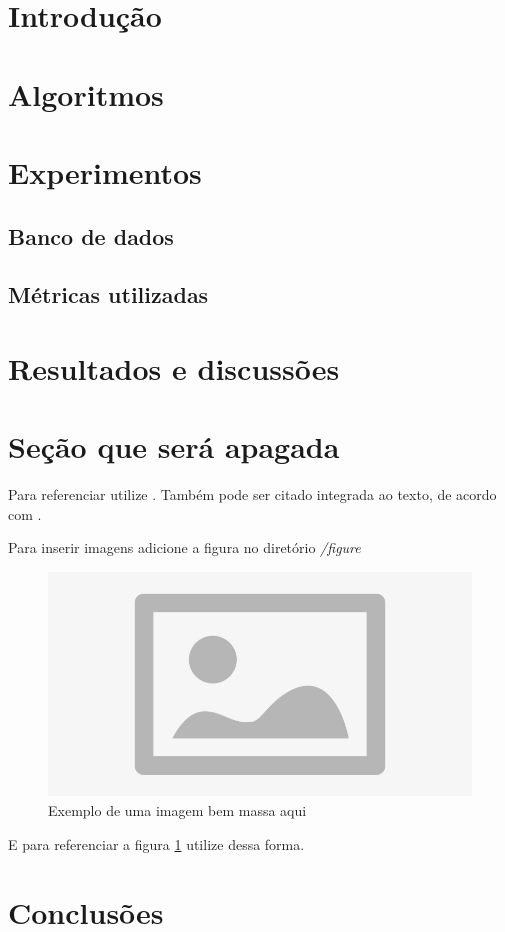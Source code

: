 
\section{Introdução}

\lipsum[2-4]

\section{Algoritmos}

\lipsum[2-4]

\section{Experimentos}

\lipsum[2-4]

\subsection{Banco de dados}

\lipsum[2-4]

\subsection{Métricas utilizadas}

\lipsum[2-4]

\section{Resultados e discussões}

\lipsum[2-4]


\section{Seção que será apagada}

Para referenciar utilize \cite{ninguem2022curioso}. Também pode ser citado integrada ao texto, de acordo com .

Para inserir imagens adicione a figura no diretório \textit{/figure} 

\begin{figure}[htbp!]
\centering
\includegraphics[width=1\textwidth]{figure/placeholder.jpg}
\caption{Exemplo de uma imagem bem massa aqui} 
\label{fig:imagem_massa}
\end{figure}

E para referenciar a figura \ref{fig:imagem_massa} utilize dessa forma.




\section{Conclusões}

\lipsum[2-4]

